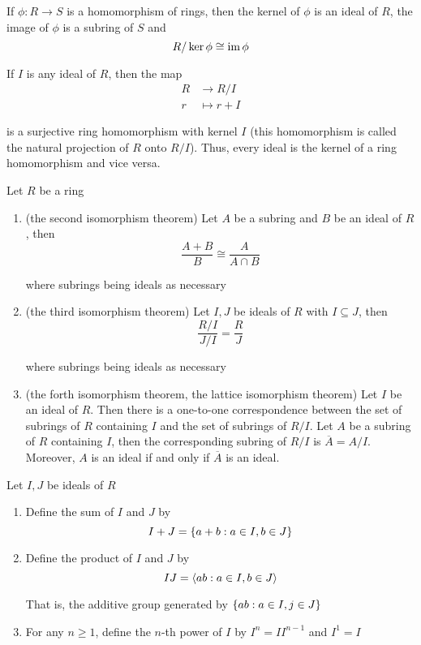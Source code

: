 \begin{theorem}
	If $\phi: R \to S$ is a homomorphism of rings, then the kernel of $\phi$ is an ideal of $R$, the image of $\phi$ is a subring of $S$ and 
	$$
		R / \ker \phi \cong \operatorname{im} \phi
	$$
	
	If $I$ is any ideal of $R$, then the map 
	\begin{align*}
		R &\to R/I \\
		r &\mapsto r + I
	\end{align*}
	
	is a surjective ring homomorphism with kernel $I$ (this homomorphism is called the natural projection of $R$ onto $R/I$). Thus, every ideal is the kernel of a ring homomorphism and vice versa.
\end{theorem}

\begin{theorem}
	Let $R$ be a ring
	\begin{enumerate}
		\item (the second isomorphism theorem) Let $A$ be a subring and $B$ be an ideal of $R$, then
		$$
			\frac{A + B}{B} \cong \frac{A}{A \cap B}
		$$
		
		where subrings being ideals as necessary	
	
		\item (the third isomorphism theorem) Let $I, J$ be ideals of $R$ with $I \subseteq J$, then
		$$
			\frac{R/I}{J/I} = \frac{R}{J}
		$$
		
		where subrings being ideals as necessary
		
		\item (the forth isomorphism theorem, the lattice isomorphism theorem) Let $I$ be an ideal of $R$. Then there is a one-to-one correspondence between the set of subrings of $R$ containing $I$ and the set of subrings of $R/I$. Let $A$ be a subring of $R$ containing $I$, then the corresponding subring of $R/I$ is $\overline{A} = A/I$. Moreover, $A$ is an ideal if and only if $\overline{A}$ is an ideal.	
\end{enumerate}
\end{theorem}

\begin{definition}
	Let $I, J$ be ideals of $R$
	\begin{enumerate}
		\item Define the sum of $I$ and $J$ by
		$$
			I + J = \{a + b: a \in I, b \in J\}
		$$
		
		\item Define the product of $I$ and $J$ by
		$$
			IJ = \langle ab: a \in I, b \in J\rangle
		$$
		
		That is, the additive group generated by $\{ab: a \in I, j \in J\}$
		
		\item For any $n \geq 1$, define the $n$-th power of $I$ by $I^n = I I^{n-1}$ and $I^1 = I$
	\end{enumerate}
\end{definition}

